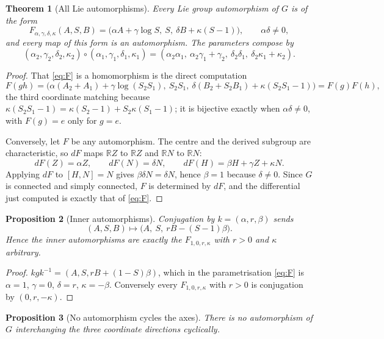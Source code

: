 \documentclass[11pt]{article}
\newtheorem{theorem}{Theorem}[section]
\newtheorem{proposition}[theorem]{Proposition}
\begin{document}
\begin{theorem}[All Lie automorphisms]
\label{thm:aut}
Every Lie group automorphism of $G$ is of the form
\begin{equation}
\label{eq:F}
F_{\alpha,\gamma,\delta,\kappa}(A,S,B)
=\bigl(\alpha A+\gamma\log S,\ S,\ \delta B+\kappa(S-1)\bigr),
\qquad \alpha\delta\ne0,
\end{equation}
and every map of this form is an automorphism. The parameters compose by
\[
(\alpha_2,\gamma_2,\delta_2,\kappa_2)\circ(\alpha_1,\gamma_1,\delta_1,\kappa_1)
=(\alpha_2\alpha_1,\ \alpha_2\gamma_1+\gamma_2,\ \delta_2\delta_1,\ \delta_2\kappa_1+\kappa_2).
\]
\end{theorem}

\begin{proof}
That \eqref{eq:F} is a homomorphism is the direct computation
\[
F(gh)=\bigl(\alpha(A_2{+}A_1)+\gamma\log(S_2S_1),\ S_2S_1,\
\delta(B_2{+}S_2B_1)+\kappa(S_2S_1{-}1)\bigr)=F(g)F(h),
\]
the third coordinate matching because
$\kappa(S_2S_1-1)=\kappa(S_2-1)+S_2\kappa(S_1-1)$; it is bijective exactly when
$\alpha\delta\ne0$, with $F(g)=e$ only for $g=e$.

Conversely, let $F$ be any automorphism. The centre and the derived subgroup are
characteristic, so $dF$ maps $\mathbb RZ$ to $\mathbb RZ$ and $\mathbb RN$ to
$\mathbb RN$:
\[
dF(Z)=\alpha Z,\qquad dF(N)=\delta N,\qquad dF(H)=\beta H+\gamma Z+\kappa N .
\]
Applying $dF$ to $[H,N]=N$ gives
$\beta\delta N=\delta N$, hence $\beta=1$ because $\delta\ne0$. Since $G$ is
connected and simply connected, $F$ is determined by $dF$, and the differential
just computed is exactly that of \eqref{eq:F}.
\end{proof}

\begin{proposition}[Inner automorphisms]
\label{prop:inner}
Conjugation by $k=(\alpha,r,\beta)$ sends
\[
(A,S,B)\longmapsto\bigl(A,\ S,\ rB-(S-1)\beta\bigr).
\]
Hence the inner automorphisms are exactly the $F_{1,0,r,\kappa}$ with $r>0$ and
$\kappa$ arbitrary.
\end{proposition}

\begin{proof}
$kgk^{-1}=(A,S,rB+(1-S)\beta)$, which in the parametrisation \eqref{eq:F} is
$\alpha=1$, $\gamma=0$, $\delta=r$, $\kappa=-\beta$. Conversely every
$F_{1,0,r,\kappa}$ with $r>0$ is conjugation by $(0,r,-\kappa)$.
\end{proof}

\begin{proposition}[No automorphism cycles the axes]
\label{prop:no-cycle}
There is no automorphism of $G$ interchanging the three coordinate directions
cyclically.
\end{proposition}
\end{document}
